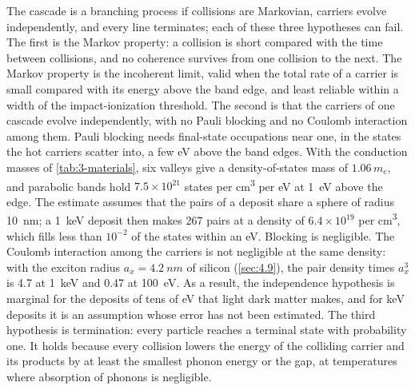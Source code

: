 The cascade is a branching process if collisions are Markovian, carriers evolve independently, and every line terminates; each of these three hypotheses can fail. The first is the Markov property: a collision is short compared with the time between collisions, and no coherence survives from one collision to the next. The Markov property is the incoherent limit, valid when the total rate of a carrier is small compared with its energy above the band edge, and least reliable within a width of the impact-ionization threshold. The second is that the carriers of one cascade evolve independently, with no Pauli blocking and no Coulomb interaction among them. Pauli blocking needs final-state occupations near one, in the states the hot carriers scatter into, a few eV above the band edges. With the conduction masses of \cref{tab:3-materials}, six valleys give a density-of-states mass of $1.06\,m_e$, and parabolic bands hold $7.5\times10^{21}$ states per \si{cm^3} per eV at \SI{1}{eV} above the edge. The estimate assumes that the pairs of a deposit share a sphere of radius \SI{10}{nm}; a \SI{1}{keV} deposit then makes 267 pairs at a density of $6.4\times10^{19}$ per \si{cm^3}, which fills less than $10^{-2}$ of the states within an eV. Blocking is negligible. The Coulomb interaction among the carriers is not negligible at the same density: with the exciton radius $a_x = \SI{4.2}{nm}$ of silicon (\cref{sec:4.9}), the pair density times $a_x^3$ is 4.7 at \SI{1}{keV} and 0.47 at \SI{100}{eV}. As a result, the independence hypothesis is marginal for the deposits of tens of eV that light dark matter makes, and for keV deposits it is an assumption whose error has not been estimated. The third hypothesis is termination: every particle reaches a terminal state with probability one. It holds because every collision lowers the energy of the colliding carrier and its products by at least the smallest phonon energy or the gap, at temperatures where absorption of phonons is negligible.

